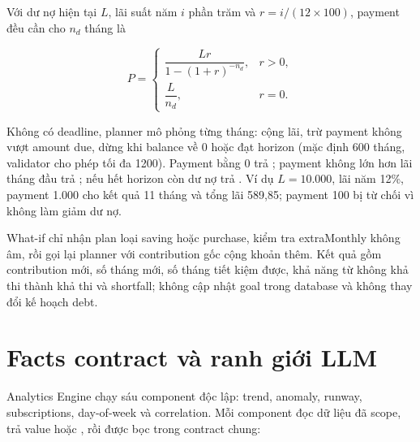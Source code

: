 Với dư nợ hiện tại $L$, lãi suất năm $i$ phần trăm và $r=i/(12\times100)$, payment đều cần cho $n_d$ tháng là

\begin{equation}
  P=\begin{cases}
  \dfrac{Lr}{1-(1+r)^{-n_d}}, & r>0,\\[6pt]
  \dfrac{L}{n_d}, & r=0.
  \end{cases}
\end{equation}

Không có deadline, planner mô phỏng từng tháng: cộng lãi, trừ payment không vượt amount due, dừng khi balance về 0 hoặc đạt horizon (mặc định 600 tháng, validator cho phép tối đa 1200). Payment bằng 0 trả ; payment không lớn hơn lãi tháng đầu trả ; nếu hết horizon còn dư nợ trả . Ví dụ $L=10.000$, lãi năm 12\%, payment 1.000 cho kết quả 11 tháng và tổng lãi 589,85; payment 100 bị từ chối vì không làm giảm dư nợ.

What-if chỉ nhận plan loại saving hoặc purchase, kiểm tra extraMonthly không âm, rồi gọi lại planner với contribution gốc cộng khoản thêm. Kết quả gồm contribution mới, số tháng mới, số tháng tiết kiệm được, khả năng từ không khả thi thành khả thi và shortfall; không cập nhật goal trong database và không thay đổi kế hoạch debt.

\section{Facts contract và ranh giới LLM}
\label{app:facts-contract}

Analytics Engine chạy sáu component độc lập: trend, anomaly, runway, subscriptions, day-of-week và correlation. Mỗi component đọc dữ liệu đã scope, trả value hoặc , rồi được bọc trong contract chung:

